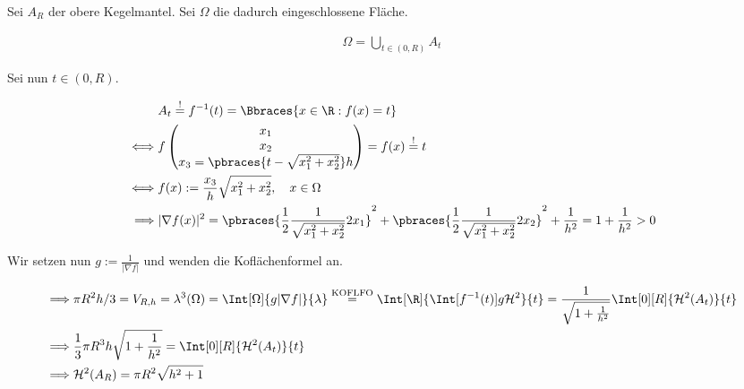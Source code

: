 \begin{solution}

Sei $A_R$ der obere Kegelmantel.
Sei $\Omega$ die dadurch eingeschlossene Fläche.

\begin{align*}
    \Omega
    =
    \bigcup_{t \in (0, R)}
        A_t
\end{align*}

Sei nun $t \in (0, R)$.

\begin{align*}
    &
    A_t \stackrel{!}{=} f^{-1}(t) = \Bbraces{x \in \R: f(x) = t} \\
    \iff &
    f
    \begin{pmatrix}
        x_1 \\ x_2 \\ x_3 = \pbraces{t - \sqrt{x_1^2 + x_2^2}} h
    \end{pmatrix}
    =
    f(x)
    \stackrel{!}{=}
    t \\
    \iff &
    f(x) := \frac{x_3}{h} \sqrt{x_1^2 + x_2^2},
    \quad
    x \in \Omega \\
    \implies &
    |\nabla f(x)|^2
    =
    \pbraces
    {
        \frac{1}{2}
        \frac{1}{\sqrt{x_1^2 + x_2^2}}
        2 x_1
    }^2
    +
    \pbraces
    {
        \frac{1}{2}
        \frac{1}{\sqrt{x_1^2 + x_2^2}}
        2 x_2
    }^2
    +
    \frac{1}{h^2}
    =
    1 + \frac{1}{h^2} > 0
\end{align*}

Wir setzen nun $g := \frac{1}{|\nabla f|}$ und wenden die Koflächenformel an.

\begin{align*}
    \implies &
    \pi R^2 h / 3
    =
    V_{R, h}
    =
    \lambda^3(\Omega)
    =
    \Int[\Omega]{g |\nabla f|}{\lambda}
    \stackrel
    {
        \text{KOFLFO}
    }{=}
    \Int[\R]
    {
        \Int[f^{-1}(t)]
        {
            g
        }{\mathcal{H}^2}
    }{t}
    =
    \frac{1}{\sqrt{1 + \frac{1}{h^2}}}
    \Int[0][R]
    {
        \mathcal{H}^2(A_t)
    }{t} \\
    \implies &
    \frac{1}{3}
    \pi R^3 h
    \sqrt{1 + \frac{1}{h^2}}
    =
    \Int[0][R]
    {
        \mathcal{H}^2(A_t)
    }{t} \\
    \implies &
    \mathcal{H}^2(A_R)
    =
    \pi R^2 \sqrt{h^2 + 1}
\end{align*}

\end{solution}

